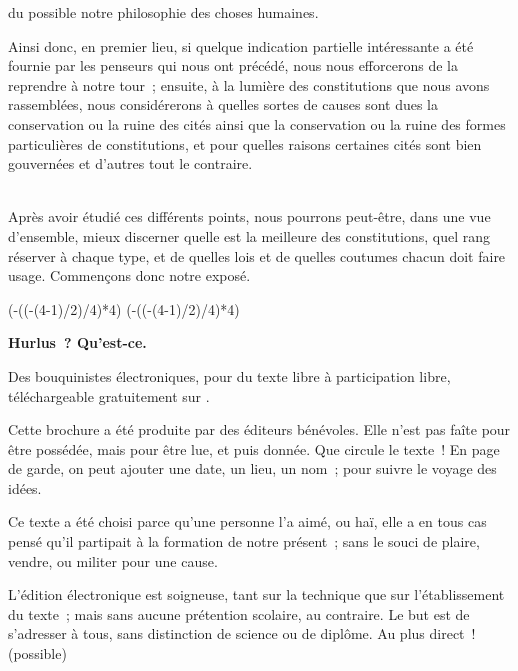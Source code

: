 \documentclass[french,twoside]{book} %
\def\truncdiv#1#2{((#1-(#2-1)/2)/#2)}
\def\moduloop#1#2{(#1-\truncdiv{#1}{#2}*#2)}
\def\modulo#1#2{\number\numexpr\moduloop{#1}{#2}\relax}
\begin{document}
du possible notre philosophie des choses humaines.\par
Ainsi donc, en premier lieu, si quelque indication partielle intéressante a été fournie par les penseurs qui nous ont précédé, nous nous efforcerons de la reprendre à notre tour ; ensuite, à la lumière des constitutions que nous avons rassemblées, nous considérerons à quelles sortes de causes sont dues la conservation ou la ruine des cités ainsi que la conservation ou la ruine des formes particulières de constitutions, et pour quelles raisons certaines cités sont bien gouvernées et d’autres tout le contraire.\par
\\
Après avoir étudié ces différents points, nous pourrons peut-être, dans une vue d’ensemble, mieux discerner quelle est la meilleure des constitutions, quel rang réserver à chaque type, et de quelles lois et de quelles coutumes chacun doit faire usage. Commençons donc notre exposé.
 


\ifbooklet
  \pagestyle{empty}
  \clearpage
  \ifnum\modulo{\value{page}}{4}=0 \hbox{}\newpage\hbox{}\newpage\fi
  \ifnum\modulo{\value{page}}{4}=1 \hbox{}\newpage\hbox{}\newpage\fi


  \hbox{}\newpage
  \ifodd\value{page}\hbox{}\newpage\fi
  {\centering\color{rubric}\bfseries\noindent\large
    Hurlus ? Qu’est-ce.\par
    \bigskip
  }
  \noindent Des bouquinistes électroniques, pour du texte libre à participation libre,
  téléchargeable gratuitement sur \href{https://hurlus.fr}{}.\par
  \bigskip
  \noindent Cette brochure a été produite par des éditeurs bénévoles.
  Elle n’est pas faîte pour être possédée, mais pour être lue, et puis donnée.
  Que circule le texte !
  En page de garde, on peut ajouter une date, un lieu, un nom ; pour suivre le voyage des idées.
  \par

  Ce texte a été choisi parce qu’une personne l’a aimé,
  ou haï, elle a en tous cas pensé qu’il partipait à la formation de notre présent ;
  sans le souci de plaire, vendre, ou militer pour une cause.
  \par

  L’édition électronique est soigneuse, tant sur la technique
  que sur l’établissement du texte ; mais sans aucune prétention scolaire, au contraire.
  Le but est de s’adresser à tous, sans distinction de science ou de diplôme.
  Au plus direct ! (possible)
  \par
\end{document}
